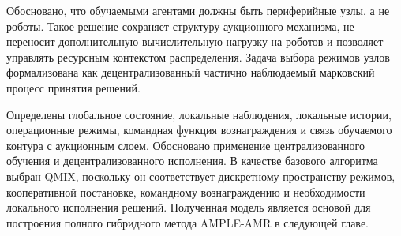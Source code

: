 Обосновано, что обучаемыми агентами должны быть периферийные узлы, а не роботы. Такое решение сохраняет структуру аукционного механизма, не переносит дополнительную вычислительную нагрузку на роботов и позволяет управлять ресурсным контекстом распределения. Задача выбора режимов узлов формализована как децентрализованный частично наблюдаемый марковский процесс принятия решений.

Определены глобальное состояние, локальные наблюдения, локальные истории, операционные режимы, командная функция вознаграждения и связь обучаемого контура с аукционным слоем. Обосновано применение централизованного обучения и децентрализованного исполнения. В качестве базового алгоритма выбран QMIX, поскольку он соответствует дискретному пространству режимов, кооперативной постановке, командному вознаграждению и необходимости локального исполнения решений. Полученная модель является основой для построения полного гибридного метода AMPLE-AMR в следующей главе.
